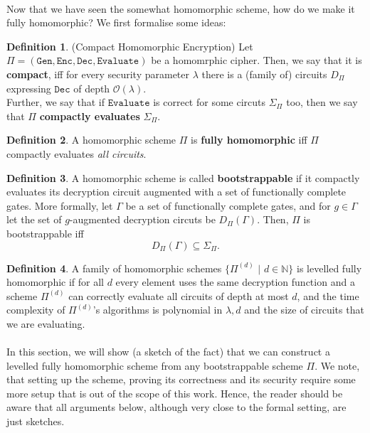\documentclass{article}
\theoremstyle{definition}
\newtheorem{definition}{Definition}[section]
\theoremstyle{example}
\newcommand{\Enc}{\texttt{Enc}}
\newcommand{\Dec}{\texttt{Dec}}
\newcommand{\Gen}{\texttt{Gen}}
\newcommand{\Evaluate}{\texttt{Evaluate}}
\newcommand{\Oh}{\mathcal{O}}
\newcommand{\Nat}{\mathbb{N}}
\begin{document}
\paragraph{}
Now that we have seen the somewhat homomorphic scheme, how do we make it fully
homomorphic? We first formalise some ideas:
\begin{definition}{(Compact Homomorphic Encryption)}
  Let $\Pi = (\Gen, \Enc, \Dec, \Evaluate)$ be a homomrphic cipher. Then, we say that it is \textbf{compact},
  iff for every security parameter $\lambda$ there is a (family of) circuits $D_\Pi$
  expressing $\Dec$ of depth $\Oh(\lambda)$.\\
  Further, we say that if $\Evaluate$ is correct for some circuts $\Sigma_\Pi$ too,
  then we say that $\Pi$ \textbf{compactly evaluates} $\Sigma_\Pi$.
\end{definition}
\begin{definition}
  A homomorphic scheme $\Pi$ is \textbf{fully homomorphic} iff $\Pi$ compactly evaluates
  \textit{all circuits}.
\end{definition}
\begin{definition}
  A homomorphic scheme is called \textbf{bootstrappable} if it compactly
  evaluates its decryption circuit augmented with a set of functionally complete
  gates. More formally, let $\Gamma$ be a set of functionally complete gates,
  and for $g \in \Gamma$ let the set of $g$-augmented decryption circuts be
  $D_\Pi(\Gamma)$. Then, $\Pi$ is bootstrappable iff
  \[
    D_\Pi(\Gamma) \subseteq \Sigma_\Pi.
  \] 
\end{definition}
\begin{definition}
  A family of homomorphic schemes $\{\Pi^{(d)}\,\,|\,\,d\in\Nat\}$ is levelled
  fully homomorphic if for all $d$ every element uses the same decryption
  function and a scheme $\Pi^{(d)}$ can correctly evaluate all circuits of depth
  at most $d$, and the time complexity of $\Pi^{(d)}$'s algorithms is
  polynomial in $\lambda, d$ and the size of circuits that we are evaluating.
\end{definition}
\paragraph{} In this section, we will show (a sketch of the fact) that we can construct a levelled
fully homomorphic scheme from any bootstrappable scheme $\Pi$. We note, that
setting up the scheme, proving its correctness and its security require some
more setup that is out of the scope of this work. Hence, the reader should be
aware that all arguments below, although very close to the formal setting, are
just sketches. 
\end{document}
